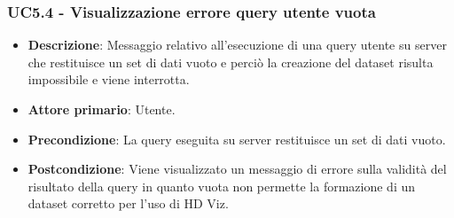 \subsubsection{UC5.4 - Visualizzazione errore query utente vuota}
\label{subsec:uc5.1.2}
\begin{itemize}
    \item \textbf{Descrizione}: Messaggio relativo all'esecuzione di una query utente su server che restituisce 
                                un set di dati vuoto e
                                perciò la creazione del dataset risulta impossibile e viene interrotta.

    \item \textbf{Attore primario}: Utente.
    
    \item \textbf{Precondizione}:   La query eseguita su server restituisce un set di dati vuoto.

    \item \textbf{Postcondizione}:   Viene visualizzato un messaggio di errore sulla validità del risultato della query 
                                        in quanto vuota non permette la formazione di un dataset corretto per l'uso di HD Viz.


\end{itemize}